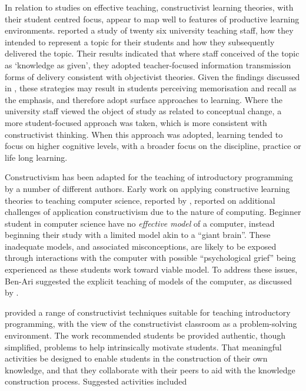 In relation to studies on effective teaching, constructivist learning theories, with their student centred focus, appear to map well to features of productive learning environments. \citet{Martin:2000} reported a study of twenty six university teaching staff, how they intended to represent a topic for their students and how they subsequently delivered the topic. Their results indicated that where staff conceived of the topic as `knowledge as given', they adopted teacher-focused information transmission forms of delivery consistent with objectivist theories. Given the findings discussed in , these strategies may result in students perceiving memorisation and recall as the emphasis, and therefore adopt surface approaches to learning. Where the university staff viewed the object of study as related to conceptual change, a more student-focused approach was taken, which is more consistent with constructivist thinking. When this approach was adopted, learning tended to focus on higher cognitive levels, with a broader focus on the discipline, practice or life long learning. 


Constructivism has been adapted for the teaching of introductory programming by a number of different authors. Early work on applying constructive learning theories to teaching computer science, reported by \citet{BenAri:1998,BenAri:2001}, reported on additional challenges of application constructivism due to the nature of computing. Beginner student in computer science have no \emph{effective model} of a computer, instead beginning their study with a limited model akin to a ``giant brain''. These inadequate models, and associated misconceptions, are likely to be exposed through interactions with the computer with possible ``psychological grief'' being experienced as these students work toward viable model. To address these issues, Ben-Ari suggested the explicit teaching of models of the computer, as discussed by \citet{DuBoulay:1986}. 

\citet{VanGorp:2001} provided a range of constructivist techniques suitable for teaching introductory programming, with the view of the constructivist classroom as a problem-solving environment. The work recommended students be provided authentic, though simplified, problems to help intrinsically motivate students. That meaningful activities be designed to enable students in the construction of their own knowledge, and that they collaborate with their peers to aid with the knowledge construction process. Suggested activities included

